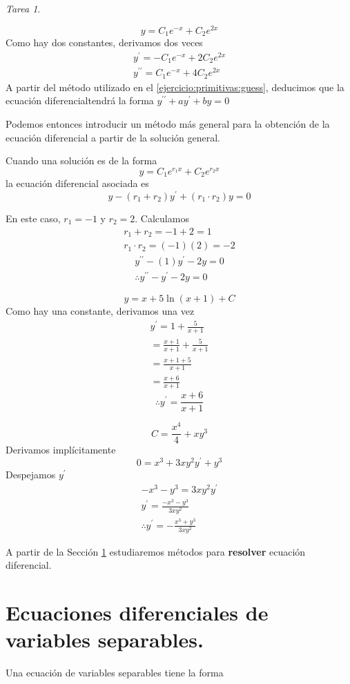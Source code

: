 \documentclass[12pt]{article} %
\theoremstyle{remark} %
\newtheorem{tarea}{Tarea}[section] %
\newcounter{ejercicio}[tarea]
\newcommand{\ed}{ecuación diferencial}
\begin{document}
\begin{tarea}
  \begin{ejercicio}[4]
    \[ y = C_1e^{-x} + C_2e^{2x} \]
    Como hay dos constantes, derivamos dos veces
    \begin{gather*}
      y^{\prime} = -C_1e^{-x} + 2C_2e^{2x}\\
      y^{\prime \prime} = C_1e^{-x} + 4C_2e^{2x}
    \end{gather*}
    A partir del método utilizado en el \cref{ejercicio:primitivas:guess}, deducimos que la \ed tendrá la forma 
    $y^{\prime \prime} + ay^{\prime} + by = 0$

    Podemos entonces introducir un método más general para la obtención de la ecuación diferencial a partir 
    de la solución general.

    Cuando una solución es de la forma \[ y = C_1e^{r_1x} + C_2e^{r_2x} \]
    la ecuación diferencial asociada es \[ y - (r_1 + r_2)y^{\prime} + (r_1 \cdot r_2)y = 0 \]

    En este caso, $r_1 = -1$ y $r_2 = 2$. Calculamos 
    \begin{gather*}
      r_1 + r_2 = -1 + 2 = 1\\
      r_1 \cdot r_2 = (-1)(2) = -2
    \end{gather*}
    \begin{gather*}
      y^{\prime \prime} -(1)y^{\prime} -2y = 0\\
      \therefore y^{\prime \prime} - y^{\prime} - 2y = 0
    \end{gather*}
  \end{ejercicio}
  \begin{ejercicio}[7]
    \[ y = x + 5 \ln(x+1) + C \]
    Como hay una constante, derivamos una vez
    \begin{gather*}
      y^{\prime} = 1 + \frac{5}{x+1}\\[0.5em]
      = \frac{x+1}{x+1} + \frac{5}{x+1}\\[0.5em]
      = \frac{x+1+5}{x+1}\\[0.5em]
      = \frac{x+6}{x+1}
    \end{gather*}
    \[ \therefore y^{\prime} = \frac{x+6}{x+1} \]
  \end{ejercicio}
  \begin{ejercicio}[9]
    \[ C = \frac{x^4}{4} + xy^{3} \]
    Derivamos implícitamente \[ 0 = x^3 + 3xy^2y^{\prime} + y^3 \]
    Despejamos $y^{\prime}$
    \begin{gather*}
      -x^3 - y^3 = 3xy^2y^{\prime}\\[0.5em]
      y^{\prime} = \frac{-x^3-y^3}{3xy^2}\\[0.5em]
      \therefore y^{\prime} = - \frac{x^3 + y^3}{3xy^2}
    \end{gather*}
  \end{ejercicio}
\end{tarea}
A partir de la Sección \ref{sec:variablesSeparables} estudiaremos métodos para \textbf{resolver} \ed .

\section{Ecuaciones diferenciales de variables separables.}
\label{sec:variablesSeparables}
Una ecuación de variables separables tiene la forma 
\end{document}
